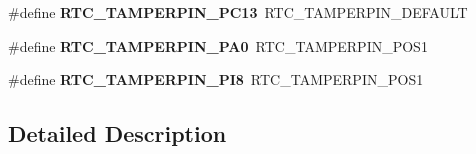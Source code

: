\begin{DoxyCompactItemize}
\#define {\bfseries R\+T\+C\+\_\+\+T\+A\+M\+P\+E\+R\+P\+I\+N\+\_\+\+P\+C13}~R\+T\+C\+\_\+\+T\+A\+M\+P\+E\+R\+P\+I\+N\+\_\+\+D\+E\+F\+A\+U\+LT
\item 
\mbox{\label{group___h_a_l___r_t_c___aliased___defines_ga0eddec9c4aeae415fe983c2940a45a9d}} 
\#define {\bfseries R\+T\+C\+\_\+\+T\+A\+M\+P\+E\+R\+P\+I\+N\+\_\+\+P\+A0}~R\+T\+C\+\_\+\+T\+A\+M\+P\+E\+R\+P\+I\+N\+\_\+\+P\+O\+S1
\item 
\mbox{\label{group___h_a_l___r_t_c___aliased___defines_ga281fbac5fa3ba4677a329635519f2bb5}} 
\#define {\bfseries R\+T\+C\+\_\+\+T\+A\+M\+P\+E\+R\+P\+I\+N\+\_\+\+P\+I8}~R\+T\+C\+\_\+\+T\+A\+M\+P\+E\+R\+P\+I\+N\+\_\+\+P\+O\+S1
\end{DoxyCompactItemize}


\subsection{Detailed Description}

